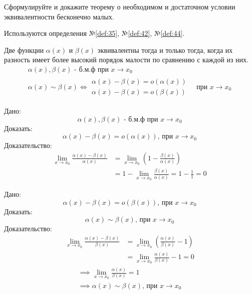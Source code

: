 \begin{question}
    Сформулируйте и докажите теорему о необходимом и достаточном условии эквивалентности бесконечно малых.
\end{question}
\begin{used}
    Используются определения №\ref{def:35}, №\ref{def:42}, №\ref{def:44}.
\end{used}
\begin{theorem}
    Две функции $\alpha(x)$ и $\beta(x)$ эквивалентны тогда и только тогда, когда их разность имеет более высокий порядок малости по сравнению с каждой из них.
    \begin{gather*}
        \alpha(x), \beta(x) \text{ - б.м.ф при } x \to x_0 \\
        \alpha(x) \sim \beta(x) \iff 
        \begin{matrix}
            \alpha(x) - \beta(x) = o(\alpha(x)) \\
            \alpha(x) - \beta(x) = o(\beta(x))
        \end{matrix}
        \quad \text{при } x \to x_0
    \end{gather*}
\end{theorem}
\begin{necessity}
    Дано: \[
        \alpha(x), \beta(x) \text{ - б.м.ф при } x \to x_0
    \] 
    Доказать: \[
        \alpha(x) - \beta(x) = o(\alpha(x)) \text{, при } x \to x_0
    \] 
    Доказательство:
    \begin{align*}
        \lim_{x \to x_0} \frac{\alpha(x) - \beta(x)}{\alpha(x)} &= \lim_{x \to x_0} \left( 1 - \frac{\beta(x)}{\alpha(x)} \right) \\
            &= 1 - \lim_{x \to x_0} \frac{\beta(x)}{\alpha(x)} = 1 - \frac{1}{1} = 0
    \end{align*}
\end{necessity}
\begin{sufficiency}
    Дано: \[
        \alpha(x) - \beta(x) = o(\beta(x)) \text{, при } x \to x_0
    \]
    Доказать: \[
        \alpha(x) \sim \beta(x) \text{, при } x \to x_0
    \] 
    Доказательство:
    \begin{align*}
        \lim_{x \to x_0} \frac{\alpha(x) - \beta(x)}{\beta(x)} &= \lim_{x \to x_0} \left( \frac{\alpha(x)}{\beta(x)} - 1 \right)  \\
            &= \lim_{x \to x_0} \frac{\alpha(x)}{\beta(x)} - 1 = 0
    \end{align*}
    \begin{gather*}
        \implies \lim_{x \to x_0} \frac{\alpha(x)}{\beta(x)} = 1 \\
        \implies \alpha(x) \sim \beta(x) \text{, при } x \to x_0 
    \end{gather*}
\end{sufficiency}
\pagebreak




